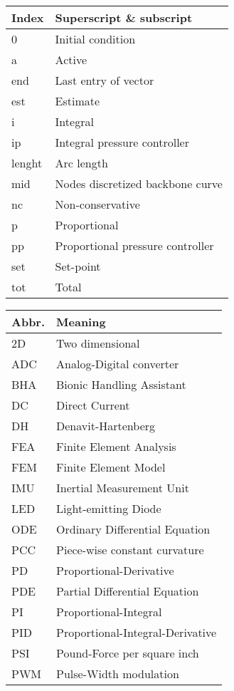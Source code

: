 \begin{spacing}{0.9}
\begin{multicols}{2}
\begin{table}[H]
\centering
    \begin{tabular}{p{1.1cm} p{5.4cm}} \hline
    \textbf{Index}    &   \textbf{Superscript \& subscript}\\ \hline
    0     &  Initial condition \\
    a     &  Active \\
    end   & Last entry of vector \\
    est   & Estimate \\
    i     & Integral \\
    ip     & Integral pressure controller \\
    lenght & Arc length \\
    mid    & Nodes discretized backbone curve \\
    nc    & Non-conservative \\
    p    & Proportional \\
    pp    & Proportional pressure controller\\
    set   & Set-point \\
    tot    & Total \\
    \end{tabular}
\end{table}






\begin{table}[H]
\centering
    \begin{tabular}{p{1.5cm} p{5cm}} \hline
    \textbf{Abbr.}    &   \textbf{Meaning }\\ \hline
    2D       & Two dimensional \\
    ADC     &  Analog-Digital converter\\
    BHA    &  Bionic Handling Assistant\\
    DC    &  Direct Current\\
    DH    &  Denavit-Hartenberg\\
    FEA     &  Finite Element Analysis \\
    FEM     &  Finite Element Model \\
    IMU    & Inertial Measurement Unit \\
    LED   & Light-emitting Diode \\
    ODE   & Ordinary Differential Equation \\
    PCC   & Piece-wise constant curvature \\
    PD    & Proportional-Derivative \\
    PDE    & Partial Differential Equation \\
    PI   & Proportional-Integral \\
    PID   & Proportional-Integral-Derivative\\
    PSI    & Pound-Force per square inch\\
    PWM    & Pulse-Width modulation\\  \hline
    \end{tabular}
\end{table}





\end{multicols}
\end{spacing}
